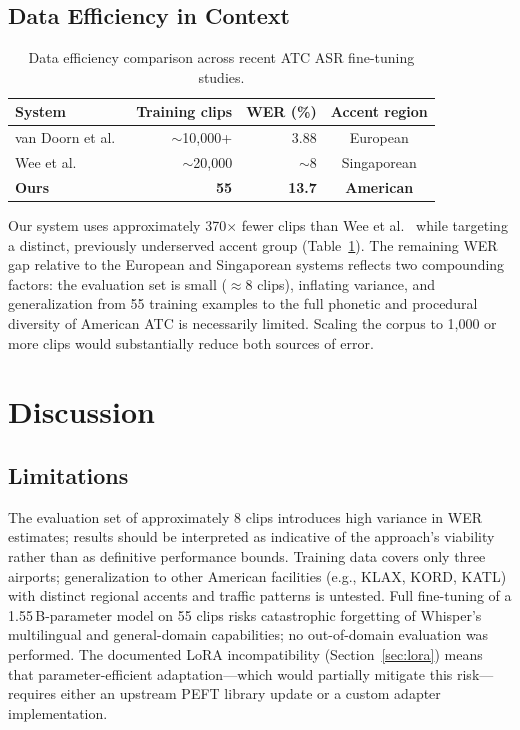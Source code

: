 \documentclass[11pt,a4paper]{article}
\begin{document}
\subsection{Data Efficiency in Context}

\begin{table}[h]
\centering
\caption{Data efficiency comparison across recent ATC ASR fine-tuning studies.}
\label{tab:comparison}
\begin{tabular}{lrrc}
\toprule
\textbf{System} & \textbf{Training clips} & \textbf{WER (\%)} & \textbf{Accent region} \\
\midrule
van Doorn et al.~\cite{vandoorn2024whisperatc} & $\sim$10,000+ & 3.88 & European \\
Wee et al.~\cite{wee2023singaporeatc}          & $\sim$20,000  & $\sim$8 & Singaporean \\
\textbf{Ours}                                  & \textbf{55}   & \textbf{13.7} & \textbf{American} \\
\bottomrule
\end{tabular}
\end{table}

Our system uses approximately 370$\times$ fewer clips than Wee et
al.~\cite{wee2023singaporeatc} while targeting a distinct, previously
underserved accent group (Table~\ref{tab:comparison}). The remaining WER
gap relative to the European and Singaporean systems reflects two compounding
factors: the evaluation set is small ($\approx$8 clips), inflating variance,
and generalization from 55 training examples to the full phonetic and
procedural diversity of American ATC is necessarily limited. Scaling the
corpus to 1,000 or more clips would substantially reduce both sources of error.

\section{Discussion}
\label{sec:discussion}

\subsection{Limitations}

The evaluation set of approximately 8 clips introduces high variance in WER
estimates; results should be interpreted as indicative of the approach's
viability rather than as definitive performance bounds. Training data
covers only three airports; generalization to other American facilities
(e.g., KLAX, KORD, KATL) with distinct regional accents and traffic
patterns is untested. Full fine-tuning of a 1.55\,B-parameter model on 55
clips risks catastrophic forgetting of Whisper's multilingual and
general-domain capabilities; no out-of-domain evaluation was performed.
The documented LoRA incompatibility (Section~\ref{sec:lora}) means that
parameter-efficient adaptation---which would partially mitigate this
risk---requires either an upstream PEFT library update or a custom
adapter implementation.
\end{document}
